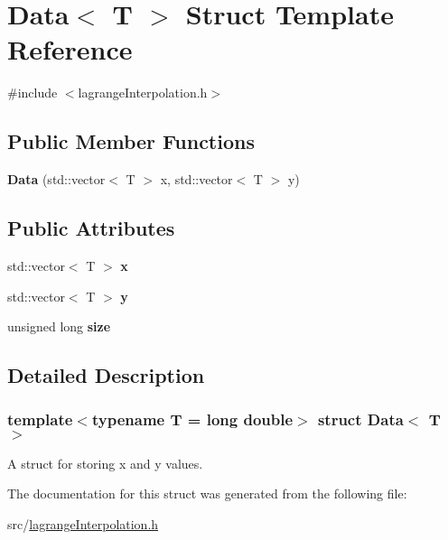 \hypertarget{struct_data}{}\section{Data$<$ T $>$ Struct Template Reference}
\label{struct_data}


{\ttfamily \#include $<$lagrange\+Interpolation.\+h$>$}

\subsection*{Public Member Functions}
\begin{DoxyCompactItemize}
\item 
\mbox{\label{struct_data_a88875589ade92d5769a808de87d99966}} 
{\bfseries Data} (std\+::vector$<$ T $>$ x, std\+::vector$<$ T $>$ y)
\end{DoxyCompactItemize}
\subsection*{Public Attributes}
\begin{DoxyCompactItemize}
\item 
\mbox{\label{struct_data_a169e63872ce770accd469a58b1e7c98b}} 
std\+::vector$<$ T $>$ {\bfseries x}
\item 
\mbox{\label{struct_data_a9b5429b1c02ecdcd67bace59b19eb952}} 
std\+::vector$<$ T $>$ {\bfseries y}
\item 
\mbox{\label{struct_data_ac31fe094e02e0aaa59938dcce0189156}} 
unsigned long {\bfseries size}
\end{DoxyCompactItemize}


\subsection{Detailed Description}
\subsubsection*{template$<$typename T = long double$>$\newline
struct Data$<$ T $>$}

A struct for storing x and y values. 

The documentation for this struct was generated from the following file\+:\begin{DoxyCompactItemize}
\item 
src/\mbox{\hyperlink{lagrange_interpolation_8h}{lagrange\+Interpolation.\+h}}\end{DoxyCompactItemize}
